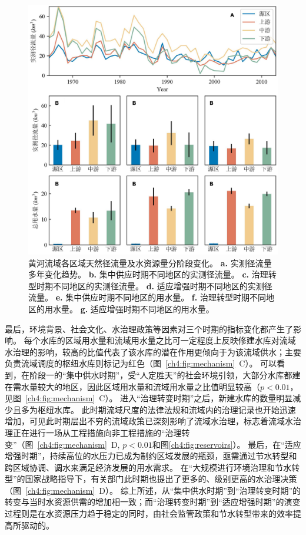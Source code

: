 \begin{figure}[!ht]
	\centering
	\includegraphics[width=\textwidth]{img/ch4/ch4_natural_water.png}
	\caption[黄河流域各区域天然径流量及水资源量分阶段变化]{
        黄河流域各区域天然径流量及水资源量分阶段变化。
        \textbf{a.} 实测径流量多年变化趋势。
        \textbf{b.} 集中供应时期不同地区的实测径流量。
        \textbf{c.} 治理转型时期不同地区的实测径流量。
        \textbf{d.} 适应增强时期不同地区的实测径流量。
        \textbf{e.} 集中供应时期不同地区的用水量。
        \textbf{f.} 治理转型时期不同地区的用水量。
        \textbf{g.} 适应增强时期不同地区的用水量。
    }\label{ch4:fig:natural}
\end{figure}

最后，环境背景、社会文化、水治理政策等因素对三个时期的指标变化都产生了影响。
每个水库的区域用水量和流域用水量之比可一定程度上反映修建水库对流域水治理的影响，较高的比值代表了该水库的潜在作用更倾向于为该流域供水；主要负责流域调度的枢纽水库则标记为红色（图~\ref{ch4:fig:mechanism}~C）。
可以看到，在阶段一的“集中供水时期”，受“人定胜天”的社会环境引领，大部分水库都建在需水量较大的地区，因此区域用水量和流域用水量之比值明显较高（$p<0.01$，见图~\ref{ch4:fig:mechanism}~C）。
进入“治理转变时期”之后，新建水库的数量明显减少且多为枢纽水库。
此时期流域尺度的法律法规和流域内的治理记录也开始迅速增加，可见此时期层出不穷的流域政策已深刻影响了流域水治理，标志着流域水治理正在进行一场从工程措施向非工程措施的“治理转变”（图~\ref{ch4:fig:mechanism}~D, $p<0.01$和图\ref{ch4:fig:reservoirs}）。
最后，在“适应增强时期”，持续高位的水压力已成为制约区域发展的瓶颈，亟需通过节水转型和跨区域协调、调水来满足经济发展的用水需求。
在“大规模进行环境治理和节水转型”的国家战略指导下，有关部门此时期也提出了更多的、级别更高的水治理决策（图~\ref{ch4:fig:mechanism}~D）。
综上所述，从“集中供水时期”到“治理转变时期”的转变与当时水资源供需的增加相一致；而“治理转变时期”到“适应增强时期”的演变过程则是在水资源压力趋于稳定的同时，由社会监管政策和节水转型带来的效率提高所驱动的。
